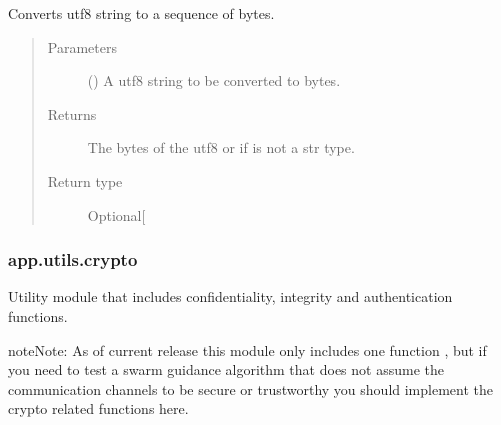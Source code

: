 \documentclass[letterpaper,10pt,english]{sphinxmanual}
\begin{document}
\begin{fulllineitems}
\label{\detokenize{app.utils:app.utils.convertions.utf8string_to_bytes}}
Converts utf\sphinxhyphen{}8 string to a sequence of bytes.
\begin{quote}\begin{description}
\item[{Parameters}] \leavevmode
{} () \textendash{} A utf\sphinxhyphen{}8 string to be converted to bytes.

\item[{Returns}] \leavevmode
The bytes of the utf\sphinxhyphen{}8  or  if 
is not a str type.

\item[{Return type}] \leavevmode
Optional{[}\sphinxhref{https://docs.python.org/3.7/library/stdtypes.html\#bytes}{bytes}{]}

\end{description}\end{quote}

\end{fulllineitems}



\subsubsection{app.utils.crypto}
\label{\detokenize{app.utils:module-app.utils.crypto}}\label{\detokenize{app.utils:app-utils-crypto}}
Utility module that includes confidentiality, integrity and authentication
functions.

\begin{sphinxadmonition}{note}{Note:}
As of current release this module only includes one function
{\hyperref[\detokenize{app.utils:app.utils.crypto.sha256}]{}}, but if you need to test a swarm guidance algorithm
that does not assume the communication channels to be secure or
trustworthy you should implement the crypto related functions here.
\end{sphinxadmonition}
\end{document}
